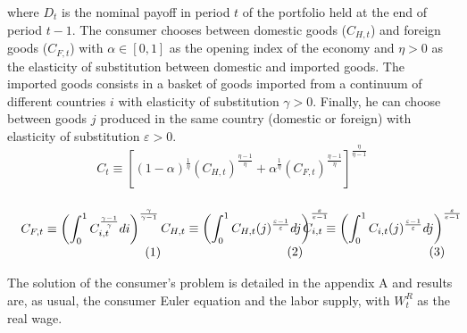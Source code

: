 \documentclass{article}
\begin{document}
where $D_t$ is the nominal payoff in period $t$ of the portfolio held at the end of period $t-1$. The consumer chooses between domestic goods ($C_{H,t}$) and foreign goods ($C_{F,t}$) with $\alpha \in [0,1]$ as the opening index of the economy and $\eta > 0$ as the elasticity of substitution between domestic and imported goods. The imported goods consists in a basket of goods imported from a continuum of different countries $i$ with elasticity of substitution $\gamma > 0$. Finally, he can choose between goods $j$ produced in the same country (domestic or foreign) with elasticity of substitution $\varepsilon > 0$.
\begin{equation}
    C_t \equiv \left[ (1-\alpha)^{\frac{1}{\eta}} (C_{H,t})^{\frac{\eta-1}{\eta}} + \alpha^{\frac{1}{\eta}} (C_{F,t})^{\frac{\eta-1}{\eta}} \right]^{\frac{\eta}{\eta-1}}
\end{equation}
\begin{subequations}
    \begin{minipage}{0.33\textwidth}
        \label{index_eqs}
        \begin{align}
            C_{F,t} \equiv \left( \int^1_0 C_{i,t}^{\frac{\gamma-1}{\gamma}} di \right)^{\frac{\gamma}{\gamma-1}} \label{foreign_index}
        \end{align}
    \end{minipage}
    \begin{minipage}{0.33\textwidth}
        \begin{align}
            C_{H,t} \equiv \left( \int^1_0 C_{H,t}(j)^{\frac{\varepsilon-1}{\varepsilon}} dj \right)^{\frac{\varepsilon}{\varepsilon-1}} \label{home_index}
        \end{align}
    \end{minipage}
    \begin{minipage}{0.33\textwidth}
        \begin{align}
            C_{i,t} \equiv \left( \int^1_0C_{i,t}(j)^{\frac{\varepsilon-1}{\varepsilon}} dj \right)^{\frac{\varepsilon}{\varepsilon-1}} \label{item_index}
        \end{align}
    \end{minipage}
\end{subequations}

The solution of the consumer's problem is detailed in the appendix A and results are, as usual, the consumer Euler equation and the labor supply, with $W_t^R$ as the real wage. 

\vspace{6pt}
\end{document}
